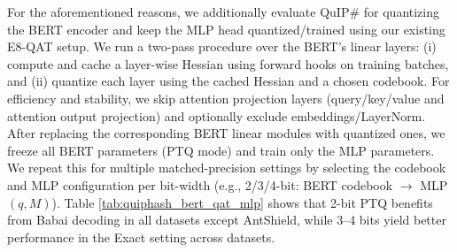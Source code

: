 \documentclass{article}
\theoremstyle{definition}
\theoremstyle{remark}
\begin{document}
For the aforementioned reasons, we additionally evaluate QuIP\# for quantizing the BERT encoder and keep the MLP head quantized/trained using our existing E8-QAT setup. We run a two-pass procedure over the BERT's linear layers: (i) compute and cache a layer-wise Hessian using forward hooks on training batches, and (ii) quantize each layer using the cached Hessian and a chosen codebook. For efficiency and stability, we skip attention projection layers (query/key/value and attention output projection) and optionally exclude embeddings/LayerNorm. After replacing the corresponding BERT linear modules with quantized ones, we freeze all BERT parameters (PTQ mode) and train only the MLP parameters. We repeat this for multiple matched-precision settings by selecting the codebook and MLP configuration per bit-width (e.g., 2/3/4-bit: BERT codebook $\rightarrow$ MLP $(q,M)$). Table \ref{tab:quiphash_bert_qat_mlp} shows that 2-bit PTQ benefits from Babai decoding in all datasets except AntShield, while 3–4 bits yield better performance in the Exact setting across datasets.
\end{document}
